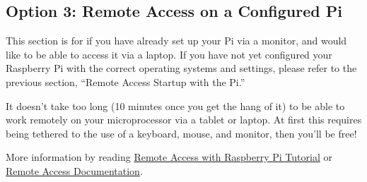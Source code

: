 \documentclass{article}\usepackage[]{graphicx}\usepackage[]{color}
\begin{document}
\subsection{Option 3: Remote Access on a Configured Pi}

This section is for if you have already set up your Pi via a monitor, and would like to be able to access it via a laptop.  If you have not yet configured your Raspberry Pi with the correct operating systems and settings, please refer to the previous section, ``Remote Access Startup with the Pi.''

It doesn't take too long (10 minutes once you get the hang of it) to be able to work remotely on your microprocessor via a tablet or laptop.  
At first this requires being tethered to the use of a keyboard, mouse, and monitor, then you'll be free!

More information by reading \href{https://pythonprogramming.net/remote-access-raspberry-pi-tutorials/?completed=/introduction-raspberry-pi-tutorials/}{Remote Access with Raspberry Pi Tutorial} or \href{https://www.raspberrypi.org/documentation/remote-access/ip-address.md}{Remote Access Documentation}.
\end{document}
